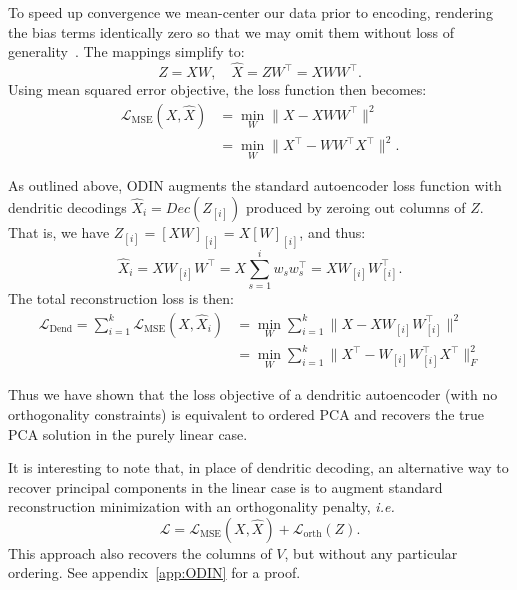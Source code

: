 \documentclass[twoside,11pt]{article}
\begin{document}
To speed up convergence we mean-center our data prior to encoding, rendering the bias terms identically zero so that we may omit them without loss of generality~\cite{plaut2018principal}. The mappings simplify to: \[ Z = X W, \quad \hat{X} = ZW^\top = XWW^\top. \]
Using mean squared error objective, the loss function then becomes:
\begin{align*}
    \mathcal{L}_{\text{MSE}}(X,\hat{X}) &= \min_W \|X-XWW^\top\|^2\\
    &= \min_W \|X^\top-WW^\top X^\top\|^2.
\end{align*}

As outlined above, ODIN augments the standard autoencoder loss function with dendritic decodings $\hat{X}_i = Dec(Z_{[i]})$ produced by zeroing out columns of $Z$. That is, we have $Z_{[i]} = [XW]_{[i]} = X{[W]_{[i]}}$, and thus:
\[\hat{X}_i= XW_{[i]}W^\top = X\sum_{s=1}^iw_sw_s^\top = XW_{[i]}W_{[i]}^\top.\] The total reconstruction loss is then:
\begin{align*}
    \mathcal{L}_{\text{Dend}}= \sum_{i=1}^k\mathcal{L}_{\text{MSE}}(X,\hat{X}_i) &= \min_W \sum_{i=1}^k\|X-XW_{[i]}W_{[i]}^\top\|^2 \\&= \min_W \sum_{i=1}^k \|X^\top-W_{[i]}W_{[i]}^\top X^\top\|_F^2
\end{align*}

Thus we have shown that the loss objective of a dendritic autoencoder (with no orthogonality constraints) is equivalent to ordered PCA and recovers the true PCA solution in the purely linear case. 

It is interesting to note that, in place of dendritic decoding, an alternative way to recover principal components in the linear case is to augment standard reconstruction minimization with an orthogonality penalty, \emph{i.e.}
\[\mathcal{L} = \mathcal{L}_{\text{MSE}}(X,\hat{X})+\mathcal{L}_{\text{orth}}(Z).\] This approach also recovers the columns of $V$, but without any particular ordering. See appendix~\ref{app:ODIN} for a proof. 
\end{document}
